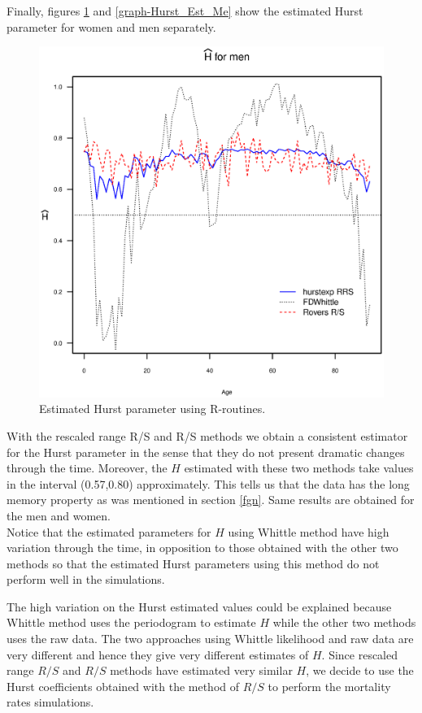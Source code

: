 \documentclass[smallextended]{svjour3}
\begin{document}
Finally, figures \ref{graph-Hurst_Est_Wo} and \ref{graph-Hurst_Est_Me} show
the estimated Hurst parameter for women and men separately.

\begin{figure}[H]
    \includegraphics[scale=0.7, keepaspectratio]{Hurst-Men.eps}
    \caption{Estimated Hurst parameter using R-routines.}
    \label{graph-Hurst_Est_Wo}
\end{figure}


With the rescaled range R/S and R/S  methods we obtain a consistent estimator
for the Hurst
parameter in the sense that they do not present dramatic changes through the
time. Moreover,
the $H$ estimated with these two methods take values in the interval
(0.57,0.80) approximately. This tells us that the data has the long memory
property as
was mentioned in section \ref{fgn}. Same results are obtained for the men and
women.\\


Notice that the estimated parameters for $H$ using Whittle method have high
variation through the time, in opposition to those
obtained with the other two methods so that the estimated
Hurst parameters using this method do not perform well in the simulations.

The high variation on the Hurst estimated values could be explained because
Whittle method uses
the periodogram to estimate $H$ while the other two methods uses the raw data.
The two approaches using Whittle likelihood and raw data are very different and
hence they give very different estimates of $H$. Since rescaled range $R/S$ and
$R/S$  methods have estimated very similar $H$, we decide to use the Hurst
coefficients obtained with the
method of $R/S$ to perform the mortality rates simulations. \\
\end{document}
